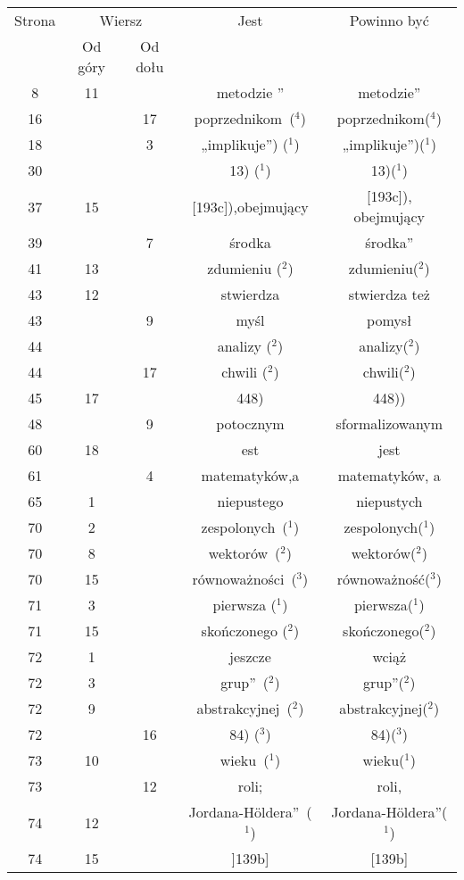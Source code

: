 \documentclass[a4paper,11pt]{article}
\begin{document}
\begin{center}

  \begin{tabular}{|c|c|c|c|c|}
    \hline
    Strona & \multicolumn{2}{c|}{Wiersz} & Jest
                              & Powinno być \\ \cline{2-3}
    & Od góry & Od dołu & & \\
    \hline
    8   & 11 & & metodzie ” & metodzie” \\
    16  & & 17 & poprzednikom~($^{ 4 }$) & poprzednikom($^{ 4 }$) \\
    18  & &  3 & „implikuje”) ($^{ 1 }$) & „implikuje”)($^{ 1 }$) \\
    30  & & & 13) ($^{ 1 }$) & 13)($^{ 1 }$) \\
    37  & 15 & & [193c]),obejmujący & [193c]), obejmujący \\
    39  & &  7 & środka & środka” \\
    41  & 13 & & zdumieniu ($^{ 2 }$) & zdumieniu($^{ 2 }$) \\
    43  & 12 & & stwierdza & stwierdza też \\
    43  & &  9 & myśl & pomysł \\
    44  & & & analizy ($^{ 2 }$) & analizy($^{ 2 }$) \\
    44  & & 17 & chwili ($^{ 2 }$) & chwili($^{ 2 }$) \\
    45  & 17 & & 448) & 448)) \\
    48  & &  9 & potocznym & sformalizowanym \\
    60  & 18 & & est & jest \\
    61  & &  4 & matematyków,a & matematyków, a \\
    65  &  1 & & niepustego & niepustych \\
    70  &  2 & & zespolonych~($^{ 1 }$) & zespolonych($^{ 1 }$) \\
    70  &  8 & & wektorów~($^{ 2 }$) & wektorów($^{ 2 }$) \\
    70  & 15 & & równoważności~($^{ 3 }$) & równoważność($^{ 3 }$) \\
    71  &  3 & & pierwsza ($^{ 1 }$) & pierwsza($^{ 1 }$) \\
    71  & 15 & & skończonego ($^{ 2 }$) & skończonego($^{ 2 }$) \\
    72  &  1 & & jeszcze & wciąż \\
    72  &  3 & & grup”~($^{ 2 }$) & grup”($^{ 2 }$) \\
    72  &  9 & & abstrakcyjnej~($^{ 2 }$) & abstrakcyjnej($^{ 2 }$) \\
    72  & & 16 & 84) ($^{ 3 }$) & 84)($^{ 3 }$) \\
    73  & 10 & & wieku~($^{ 1 }$) & wieku($^{ 1 }$) \\
    73  & & 12 & roli; & roli, \\
    74  & 12 & & Jordana-H\"{o}ldera”~($^{ 1 }$)
    & Jordana-H\"{o}ldera”($^{ 1 }$) \\
    74  & 15 & & ]139b] & [139b] \\
    \hline
  \end{tabular}






\end{center}
\end{document}
